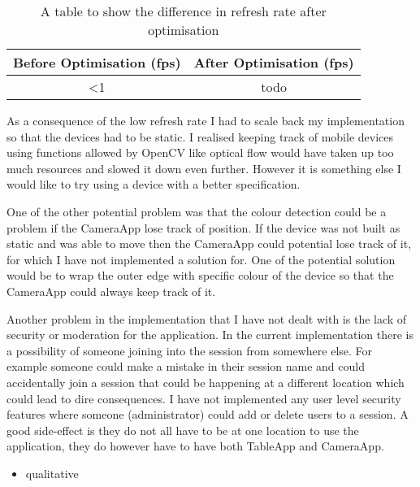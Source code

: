 \begin{table}[h]
\centering
\begin{tabular}{|c|c|}
\hline 
Before Optimisation (fps) & After Optimisation (fps)\tabularnewline
\hline 
\hline 
 \textless 1 & todo 
\tabularnewline
\hline 
\end{tabular}
\caption{A table to show the difference in refresh rate after optimisation}
\label{refresh_rate_table}
\end{table}
As a consequence of the low refresh rate I had to scale back my implementation so that the devices had to be static. I realised keeping track of mobile devices using functions allowed by OpenCV like optical flow would have taken up too much resources and slowed it down even further. However it is something else I would like to try using a device with a better specification.

One of the other potential problem was that the colour detection could be a problem if the CameraApp lose track of position. If the device was not built as static and was able to move then the CameraApp could potential lose track of it, for which I have not implemented a solution for. One of the potential solution would be to wrap the outer edge with specific colour of the device so that the CameraApp could always keep track of it.

Another problem in the implementation that I have not dealt with is the lack of security or moderation for the application. In the current implementation there is a possibility of someone joining into the session from somewhere else. For example someone could make a mistake in their session name and could accidentally join a session that could be happening at a different location which could lead to dire consequences. I have not implemented any user level security features where someone (administrator) could add or delete users to a session. A good side-effect is they do not all have to be at one location to use the application, they do however have to have both TableApp and CameraApp. 


\begin{itemize}
\item qualitative
\end{itemize}